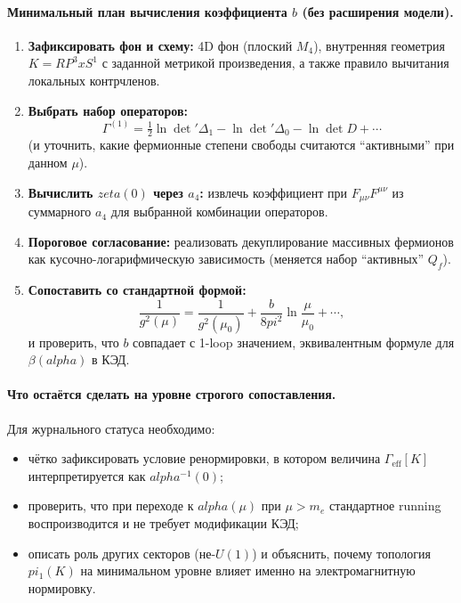 \documentclass[12pt]{article}
\def\mathbb#1{#1}%
\def\alpha{alpha}%
\def\pi{pi}%
\def\times{x}%
\def\zeta{zeta}%
\begin{document}
\paragraph{Минимальный план вычисления коэффициента $b$ (без расширения модели).}
\begin{enumerate}
  \item \textbf{Зафиксировать фон и схему:} 4D фон (плоский $M_4$), внутренняя геометрия $K=\mathbb{RP}^3\times S^1$ с заданной метрикой произведения, а также правило вычитания локальных контрчленов.

  \item \textbf{Выбрать набор операторов:}
  \begin{equation}
  \Gamma^{(1)}=\tfrac12\ln\det'\Delta_1-\ln\det'\Delta_0-\ln\det D+\cdots
  \end{equation}
  (и уточнить, какие фермионные степени свободы считаются ``активными'' при данном $\mu$).

  \item \textbf{Вычислить $\zeta(0)$ через $a_4$:} извлечь коэффициент при $F_{\mu\nu}F^{\mu\nu}$ из суммарного $a_4$ для выбранной комбинации операторов.

  \item \textbf{Пороговое согласование:} реализовать декуплирование массивных фермионов как кусочно-логарифмическую зависимость (меняется набор ``активных'' $Q_f$).

  \item \textbf{Сопоставить со стандартной формой:}
  \begin{equation}
  \frac{1}{g^2(\mu)}
  =
  \frac{1}{g^2(\mu_0)}
  +
  \frac{b}{8\pi^2}\ln\frac{\mu}{\mu_0}
  +\cdots,
  \end{equation}
  и проверить, что $b$ совпадает с 1-loop значением, эквивалентным формуле для $\beta(\alpha)$ в КЭД.
\end{enumerate}

\paragraph{Что остаётся сделать на уровне строгого сопоставления.}
Для журнального статуса необходимо:
\begin{itemize}
  \item чётко зафиксировать условие ренормировки, в котором величина $\Gamma_{\mathrm{eff}}[K]$ интерпретируется как $\alpha^{-1}(0)$;
  \item проверить, что при переходе к $\alpha(\mu)$ при $\mu>m_e$ стандартное running воспроизводится и не требует модификации КЭД;
  \item описать роль других секторов (не-$U(1)$) и объяснить, почему топология $\pi_1(K)$ на минимальном уровне влияет именно на электромагнитную нормировку.
\end{itemize}
\end{document}
